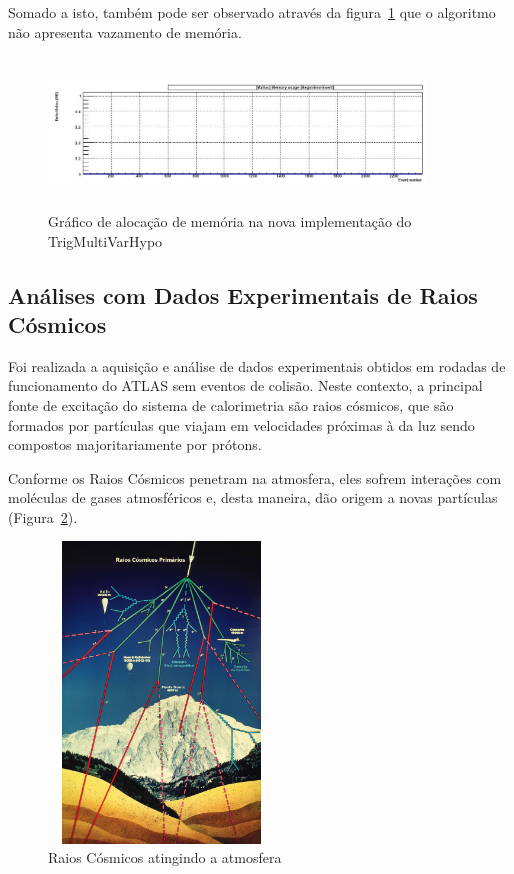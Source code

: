 \documentclass[a4paper,10pt,titlepage]{article}
\begin{document}
Somado a isto, também pode ser observado através da figura~\ref{fig:new_tmvh_maloc} que o algoritmo não apresenta vazamento de memória.

\begin{figure}[htbp!]
 \centering
 \includegraphics[width=10cm,height=4cm]{Figs/tmvh_refactoring/new_tmvh_maloc.jpeg}
 \caption{Gráfico de alocação de memória na nova implementação do TrigMultiVarHypo}
 \label{fig:new_tmvh_maloc}
\end{figure}

\clearpage

\subsection{Análises com Dados Experimentais de Raios Cósmicos}

Foi realizada a aquisição e análise de dados experimentais obtidos em rodadas de funcionamento do ATLAS sem eventos de colisão.
Neste contexto, a principal fonte de excitação do sistema de calorimetria são raios cósmicos, que são formados por partículas que viajam em velocidades próximas à da luz sendo compostos majoritariamente por prótons.

Conforme os Raios Cósmicos penetram na atmosfera, eles sofrem interações com moléculas de gases atmosféricos e, desta maneira, dão origem a novas partículas (Figura~\ref{fig:rc_sky}). 

\begin{figure}[htbp!]
 \centering
 \includegraphics[width=6cm,height=8cm]{Figs/cosmics/rc_sky.png}
 \caption{Raios Cósmicos atingindo a atmosfera}
 \label{fig:rc_sky}
\end{figure}
\end{document}
